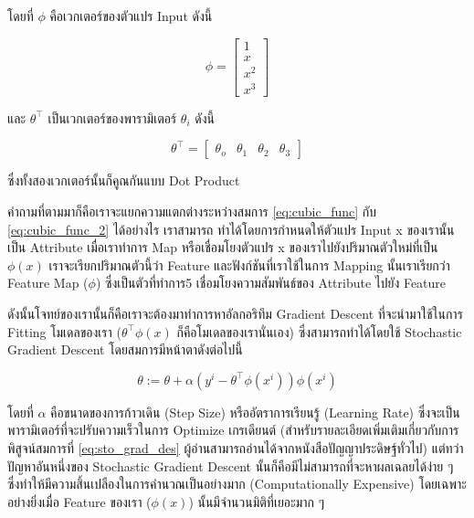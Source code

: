 โดยที่ $\phi$ คือเวกเตอร์ของตัวแปร Input ดังนี้

\begin{equation}
\phi = 
\begin{bmatrix}
    1 \\
    x \\
    x^{2} \\
    x^{3} 
\end{bmatrix}
\end{equation}

และ $\theta^{\top}$ เป็นเวกเตอร์ของพารามิเตอร์ $\theta_{i}$ ดังนี้

\begin{equation}
\theta^{\top} =
\begin{bmatrix}
    \theta_{o} & \theta_{1} & \theta_{2} & \theta_{3}
\end{bmatrix}
\end{equation}

\noindent ซึ่งทั้งสองเวกเตอร์นั้นก็คูณกันแบบ Dot Product
 
คำถามที่ตามมาก็คือเราจะแยกความแตกต่างระหว่างสมการ \ref{eq:cubic_func} กับ \ref{eq:cubic_func_2} ได้อย่างไร เราสามารถ%
ทำได้โดยการกำหนดให้ตัวแปร Input x ของเรานั้นเป็น Attribute เมื่อเราทำการ Map หรือเชื่อมโยงตัวแปร x ของเราไปยังปริมาณตัวใหม่ที่เป็น
$\phi(x)$ เราจะเรียกปริมาณตัวนี้ว่า Feature และฟังก์ชันที่เราใช้ในการ Mapping นั้นเราเรียกว่า Feature Map ($\phi$) ซึ่งเป็นตัวที่ทำการ5
เชื่อมโยงความสัมพันธ์ของ Attribute ไปยัง Feature

ดังนั้นโจทย์ของเรานั้นก็คือเราจะต้องมาทำการหาอัลกอริทึม Gradient Descent ที่จะนำมาใช้ในการ Fitting โมเดลของเรา 
($\theta^{\top}\phi(x)$ ก็คือโมเดลของเรานั่นเอง) ซึ่งสามารถทำได้โดยใช้ Stochastic Gradient Descent โดยสมการมีหน้าตาดังต่อไปนี้

\begin{equation}\label{eq:sto_grad_des}
    \theta := \theta + \alpha (y^{i} - \theta^{\top}\phi(x^{i}))\phi(x^{i})
\end{equation}

โดยที่ $\alpha$ คือขนาดของการก้าวเดิน (Step Size) หรืออัตราการเรียนรู้ (Learning Rate) ซึ่งจะเป็นพารามิเตอร์ที่จะปรับความเร็วในการ%
Optimize เกรเดียนต์ (สำหรับรายละเอียดเพิ่มเติมเกี่ยวกับการพิสูจน์สมการที่ \ref{eq:sto_grad_des} ผู้อ่านสามารถอ่านได้จากหนังสือปัญญาประดิษฐ์ทั่วไป) 
แต่ทว่าปัญหาอันหนึ่งของ Stochastic Gradient Descent นั้นก็คือมีไม่สามารถที่จะหาผลเฉลยได้ง่าย ๆ ซึ่งทำให้มีความสิ้นเปลืองในการคำนวณเป็นอย่างมาก 
(Computationally Expensive) โดยเฉพาะอย่างยิ่งเมื่อ Feature ของเรา ($\phi(x)$) นั้นมีจำนวนมิติที่เยอะมาก ๆ

